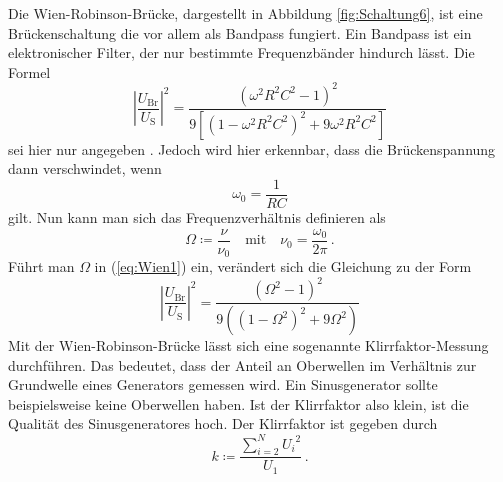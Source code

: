 Die Wien-Robinson-Brücke, dargestellt in Abbildung \ref{fig:Schaltung6}, ist eine Brückenschaltung
die vor allem als Bandpass fungiert. 
Ein Bandpass ist ein elektronischer Filter, der  nur bestimmte Frequenzbänder hindurch lässt.
Die Formel
\begin{equation} \label{eq:Wien1}
    \left|\frac{U_\text{Br}}{U_\text{S}}\right|^2 =  \frac{\left({\omega}^2 R^2 C^2 -1 \right)^2}
    {9 \left[ \left( 1 - {\omega}^2 R^2 C^2 \right)^2 + 9 {\omega}^2 R^2 C^2 \right]}
\end{equation}
sei hier nur angegeben \cite[9]{v302}.
Jedoch wird hier erkennbar, dass die Brückenspannung dann verschwindet, wenn
\begin{equation*}
    \omega_0 = \frac{1}{R C}
\end{equation*}
gilt. Nun kann man sich das Frequenzverhältnis definieren als
\begin{equation*}
    \Omega \coloneq \frac{\nu}{\nu_0} \quad \text{mit} \quad \nu_0 = \frac{\omega_0}{2\pi} \, .
\end{equation*}
Führt man $\Omega$ in (\ref{eq:Wien1}) ein, verändert sich die Gleichung zu der Form
\begin{equation} \label{eq:Wien2}
    \left|\frac{U_\text{Br}}{U_\text{S}}\right|^2 = \frac{\left( \Omega^2 -1 \right)^2}
    {9 \left( \left( 1 - \Omega^2 \right)^2 + 9 \Omega^2 \right)}
\end{equation}
Mit der Wien-Robinson-Brücke lässt sich eine sogenannte Klirrfaktor-Messung durchführen.
Das bedeutet, dass der Anteil an Oberwellen im Verhältnis zur Grundwelle eines Generators gemessen wird.
Ein Sinusgenerator sollte beispielsweise keine Oberwellen haben.
Ist der Klirrfaktor also klein, ist die Qualität des Sinusgeneratores hoch.
Der Klirrfaktor ist gegeben durch
\begin{equation} \label{eq:klirr}
    k \coloneq \frac {\sum_{i=2}^{N} {U_i}^2}{U_1}  \, .
\end{equation}
